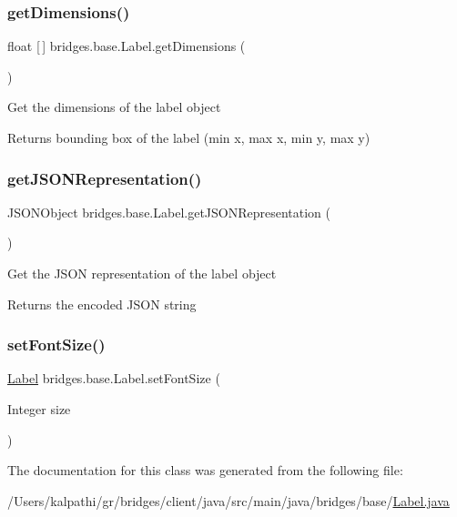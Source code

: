 \subsubsection{\texorpdfstring{get\+Dimensions()}{getDimensions()}}
{\footnotesize\ttfamily float \mbox{[}$\,$\mbox{]} bridges.\+base.\+Label.\+get\+Dimensions (\begin{DoxyParamCaption}{ }\end{DoxyParamCaption})}

Get the dimensions of the label object \begin{DoxyReturn}{Returns}
bounding box of the label (min x, max x, min y, max y) 
\end{DoxyReturn}
\mbox{\label{classbridges_1_1base_1_1_label_a6befc6655ce36868213be289571c6315}} 
\subsubsection{\texorpdfstring{get\+J\+S\+O\+N\+Representation()}{getJSONRepresentation()}}
{\footnotesize\ttfamily J\+S\+O\+N\+Object bridges.\+base.\+Label.\+get\+J\+S\+O\+N\+Representation (\begin{DoxyParamCaption}{ }\end{DoxyParamCaption})}

Get the J\+S\+ON representation of the label object

\begin{DoxyReturn}{Returns}
the encoded J\+S\+ON string 
\end{DoxyReturn}
\mbox{\label{classbridges_1_1base_1_1_label_ab5f2d60e519db2499f326c4ccb967b25}} 
\subsubsection{\texorpdfstring{set\+Font\+Size()}{setFontSize()}}
{\footnotesize\ttfamily \mbox{\hyperlink{classbridges_1_1base_1_1_label}{Label}} bridges.\+base.\+Label.\+set\+Font\+Size (\begin{DoxyParamCaption}\item[{Integer}]{size }\end{DoxyParamCaption})}



The documentation for this class was generated from the following file\+:\begin{DoxyCompactItemize}
\item 
/\+Users/kalpathi/gr/bridges/client/java/src/main/java/bridges/base/\mbox{\hyperlink{_label_8java}{Label.\+java}}\end{DoxyCompactItemize}
